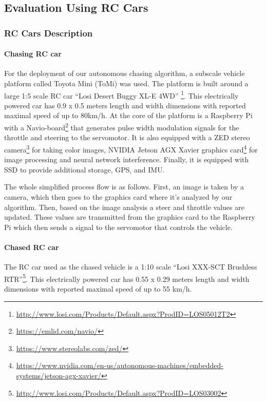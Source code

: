 \documentclass{ctuthesis/ctuthesis}
\begin{document}
\subsection{Evaluation Using RC Cars}
\subsubsection{RC Cars Description}
\paragraph{Chasing RC car}
For the deployment of our autonomous chasing algorithm, a subscale vehicle platform called Toyota Mini (ToMi) was used. The platform is built around a large 1:5 scale RC car ``Losi Desert Buggy XL-E 4WD'' \footnote{\href{http://www.losi.com/Products/Default.aspx?ProdID=LOS05012T2}{http://www.losi.com/Products/Default.aspx?ProdID=LOS05012T2}}. This electrically powered car has 0.9 x 0.5 meters length and width dimensions with reported maximal speed of up to 80km/h. At the core of the platform is a Raspberry Pi with a Navio-board\footnote{\href{https://emlid.com/navio/}{https://emlid.com/navio/}} that generates pulse width modulation signals for the throttle and steering to the servomotor. It is also equipped with a ZED stereo camera\footnote{\href{https://www.stereolabs.com/zed/}{https://www.stereolabs.com/zed/}} for taking color images, NVIDIA Jetson AGX Xavier graphics card\footnote{\href{https://www.nvidia.com/en-us/autonomous-machines/embedded-systems/jetson-agx-xavier/}{https://www.nvidia.com/en-us/autonomous-machines/embedded-systems/jetson-agx-xavier/}} for image processing and neural network interference. Finally, it is equipped with SSD to provide additional storage, GPS, and IMU. \par
The whole simplified process flow is as follows. First, an image is taken by a camera, which then goes to the graphics card where it's analyzed by our algorithm. Then, based on the image analysis a steer and throttle values are updated. These values are transmitted from the graphics card to the Raspberry Pi which then sends a signal to the servomotor that controls the vehicle.

\paragraph{Chased RC car}
The RC car used as the chased vehicle is a 1:10 scale ``Losi XXX-SCT Brushless RTR''\footnote{\href{http://www.losi.com/Products/Default.aspx?ProdID=LOS03002}{http://www.losi.com/Products/Default.aspx?ProdID=LOS03002}}. This electrically powered car has 0.55 x 0.29 meters length and width dimensions with reported maximal speed of up to 55 km/h.
\end{document}

